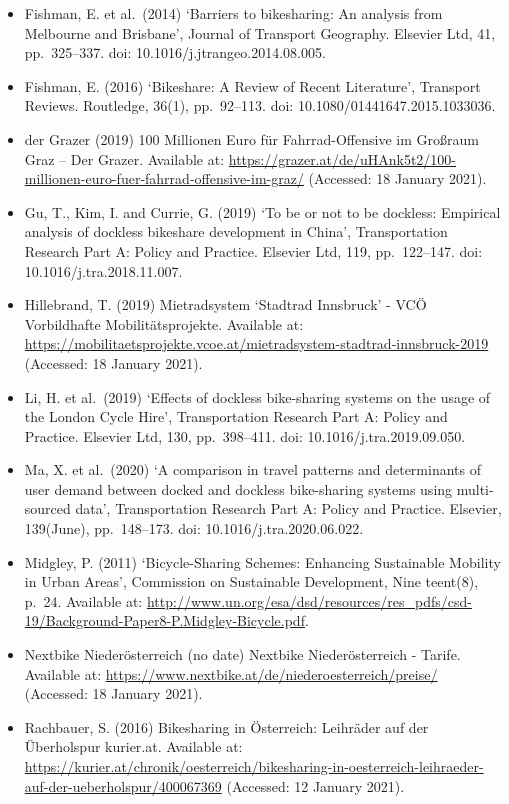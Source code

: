 \documentclass[
]{book}
\begin{document}
\begin{itemize}
\item
  Fishman, E. et al.~(2014) `Barriers to bikesharing: An analysis from Melbourne and Brisbane', Journal of Transport Geography. Elsevier Ltd, 41, pp.~325--337. doi: 10.1016/j.jtrangeo.2014.08.005.
\item
  Fishman, E. (2016) `Bikeshare: A Review of Recent Literature', Transport Reviews. Routledge, 36(1), pp.~92--113. doi: 10.1080/01441647.2015.1033036.
\item
  der Grazer (2019) 100 Millionen Euro für Fahrrad-Offensive im Großraum Graz -- Der Grazer. Available at: \url{https://grazer.at/de/uHAnk5t2/100-millionen-euro-fuer-fahrrad-offensive-im-graz/} (Accessed: 18 January 2021).
\item
  Gu, T., Kim, I. and Currie, G. (2019) `To be or not to be dockless: Empirical analysis of dockless bikeshare development in China', Transportation Research Part A: Policy and Practice. Elsevier Ltd, 119, pp.~122--147. doi: 10.1016/j.tra.2018.11.007.
\item
  Hillebrand, T. (2019) Mietradsystem `Stadtrad Innsbruck' - VCÖ Vorbildhafte Mobilitätsprojekte. Available at: \url{https://mobilitaetsprojekte.vcoe.at/mietradsystem-stadtrad-innsbruck-2019} (Accessed: 18 January 2021).
\item
  Li, H. et al.~(2019) `Effects of dockless bike-sharing systems on the usage of the London Cycle Hire', Transportation Research Part A: Policy and Practice. Elsevier Ltd, 130, pp.~398--411. doi: 10.1016/j.tra.2019.09.050.
\item
  Ma, X. et al.~(2020) `A comparison in travel patterns and determinants of user demand between docked and dockless bike-sharing systems using multi-sourced data', Transportation Research Part A: Policy and Practice. Elsevier, 139(June), pp.~148--173. doi: 10.1016/j.tra.2020.06.022.
\item
  Midgley, P. (2011) `Bicycle-Sharing Schemes: Enhancing Sustainable Mobility in Urban Areas', Commission on Sustainable Development, Nine teent(8), p.~24. Available at: \url{http://www.un.org/esa/dsd/resources/res_pdfs/csd-19/Background-Paper8-P.Midgley-Bicycle.pdf}.
\item
  Nextbike Niederösterreich (no date) Nextbike Niederösterreich - Tarife. Available at: \url{https://www.nextbike.at/de/niederoesterreich/preise/} (Accessed: 18 January 2021).
\item
  Rachbauer, S. (2016) Bikesharing in Österreich: Leihräder auf der Überholspur \textbar{} kurier.at. Available at: \url{https://kurier.at/chronik/oesterreich/bikesharing-in-oesterreich-leihraeder-auf-der-ueberholspur/400067369} (Accessed: 12 January 2021).

\end{itemize}
\end{document}
